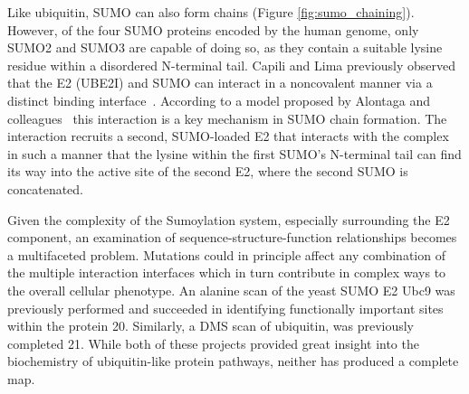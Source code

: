 Like ubiquitin, SUMO can also form chains (Figure \ref{fig:sumo_chaining}). However, of the four SUMO proteins encoded by the human genome, only SUMO2 and SUMO3 are capable of doing so, as they contain a suitable lysine residue within a disordered N-terminal tail. Capili and Lima previously observed that the E2 (UBE2I) and SUMO can interact in a noncovalent manner via a distinct binding interface~\cite{CapiliLima2007}. According to a model proposed by Alontaga and colleagues~\cite{Alontaga2015} this interaction is a key mechanism in SUMO chain formation. The interaction recruits a second, SUMO-loaded E2 that interacts with the complex in such a manner that the lysine within the first SUMO's N-terminal tail can find its way into the active site of the second E2, where the second SUMO is concatenated.



Given the complexity of the Sumoylation system, especially surrounding the E2 component, an examination of sequence-structure-function relationships becomes a multifaceted problem. Mutations could in principle affect any combination of the multiple interaction interfaces which in turn contribute in complex ways to the overall cellular phenotype.
An alanine scan of the yeast SUMO E2 Ubc9 was previously performed and succeeded in identifying functionally important sites within the protein 20. Similarly, a DMS scan of ubiquitin, was previously completed 21. While both of these projects provided great insight into the biochemistry of ubiquitin-like protein pathways, neither has produced a complete map.
